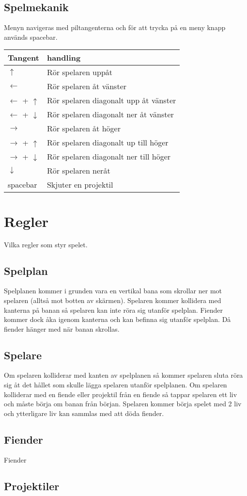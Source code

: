 \documentclass{TDP005mall}
\begin{document}
\subsection{Spelmekanik}
Menyn navigeras med piltangenterna och för att trycka på en meny knapp används spacebar.
\begin{table}[h]
\begin{tabularx}{\linewidth}{|l|X|}
\hline
  Tangent & handling \\\hline
  $\uparrow$ & Rör spelaren uppåt \\\hline
  $\leftarrow$ & Rör spelaren åt vänster \\\hline
  $\leftarrow$ + $\uparrow$ & Rör spelaren diagonalt upp åt vänster \\\hline
  $\leftarrow$ + $\downarrow$ & Rör spelaren diagonalt ner åt vänster \\\hline
  $\rightarrow$ & Rör spelaren åt höger \\\hline
  $\rightarrow$ + $\uparrow$ & Rör spelaren diagonalt up till höger \\\hline
  $\rightarrow$ + $\downarrow$ & Rör spelaren diagonalt ner till höger \\\hline
  $\downarrow$ & Rör spelaren neråt \\\hline
  spacebar & Skjuter en projektil \\\hline  
\end{tabularx}
\end{table}
\section{Regler}
Vilka regler som styr spelet.
\subsection{Spelplan}
Spelplanen kommer i grunden vara en vertikal bana som skrollar ner mot spelaren (alltså mot botten av skärmen).
Spelaren kommer kollidera med kanterna på banan så spelaren kan inte röra sig utanför spelplan.
Fiender kommer dock åka igenom kanterna och kan befinna sig utanför spelplan. Då fiender hänger med när banan skrollas. 

\subsection{Spelare}
Om spelaren kolliderar med kanten av spelplanen så kommer spelaren sluta röra sig åt det hållet som skulle lägga spelaren 
utanför spelplanen. 
Om spelaren kolliderar med en fiende eller projektil från en fiende så tappar spelaren ett liv och 
måste börja om banan från början.
Spelaren kommer börja spelet med 2 liv och ytterligare liv kan sammlas med att döda fiender.

\subsection{Fiender}
Fiender 
\subsection{Projektiler}
\end{document}
